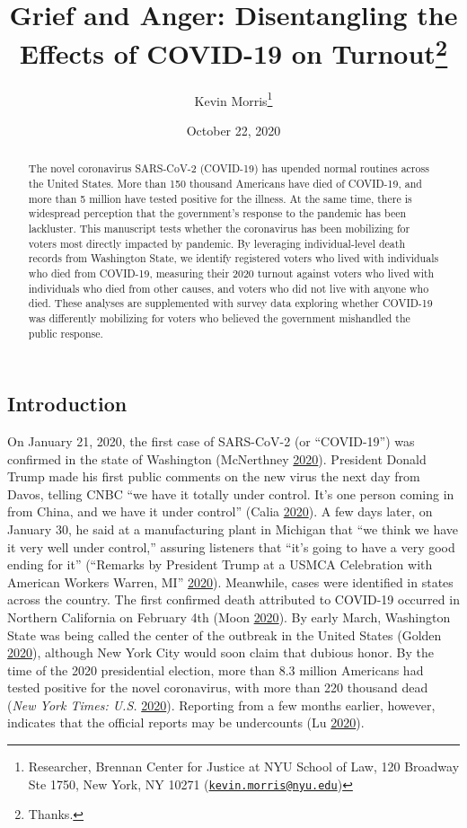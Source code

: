 \documentclass[
  12pt,
]{article}
\title{Grief and Anger: Disentangling the Effects of COVID-19 on Turnout\thanks{Thanks.}}
\author{Kevin Morris\footnote{Researcher, Brennan Center for Justice at NYU School of Law, 120 Broadway Ste 1750, New York, NY 10271 (\href{mailto:kevin.morris@nyu.edu}{\nolinkurl{kevin.morris@nyu.edu}})}}
\date{October 22, 2020}
\begin{document}
\maketitle
\begin{abstract}
The novel coronavirus SARS-CoV-2 (COVID-19) has upended normal routines across the United States. More than 150 thousand Americans have died of COVID-19, and more than 5 million have tested positive for the illness. At the same time, there is widespread perception that the government's response to the pandemic has been lackluster. This manuscript tests whether the coronavirus has been mobilizing for voters most directly impacted by pandemic. By leveraging individual-level death records from Washington State, we identify registered voters who lived with individuals who died from COVID-19, measuring their 2020 turnout against voters who lived with individuals who died from other causes, and voters who did not live with anyone who died. These analyses are supplemented with survey data exploring whether COVID-19 was differently mobilizing for voters who believed the government mishandled the public response.
\end{abstract}

\pagebreak


\hypertarget{introduction}{%
\subsection*{Introduction}\label{introduction}}

On January 21, 2020, the first case of SARS-CoV-2 (or ``COVID-19'') was confirmed in the state of Washington (McNerthney \protect\hyperlink{ref-McNerthney2020}{2020}). President Donald Trump made his first public comments on the new virus the next day from Davos, telling CNBC ``we have it totally under control. It's one person coming in from China, and we have it under control'' (Calia \protect\hyperlink{ref-Calia2020}{2020}). A few days later, on January 30, he said at a manufacturing plant in Michigan that ``we think we have it very well under control,'' assuring listeners that ``it's going to have a very good ending for it'' (``Remarks by President Trump at a USMCA Celebration with American Workers \textbar{} Warren, MI'' \protect\hyperlink{ref-whitehouse2020}{2020}). Meanwhile, cases were identified in states across the country. The first confirmed death attributed to COVID-19 occurred in Northern California on February 4th (Moon \protect\hyperlink{ref-Moon2020}{2020}). By early March, Washington State was being called the center of the outbreak in the United States (Golden \protect\hyperlink{ref-Golden2020}{2020}), although New York City would soon claim that dubious honor. By the time of the 2020 presidential election, more than 8.3 million Americans had tested positive for the novel coronavirus, with more than 220 thousand dead (\emph{New York Times: U.S.} \protect\hyperlink{ref-nyt2020}{2020}). Reporting from a few months earlier, however, indicates that the official reports may be undercounts (Lu \protect\hyperlink{ref-Lu2020}{2020}).
\end{document}
